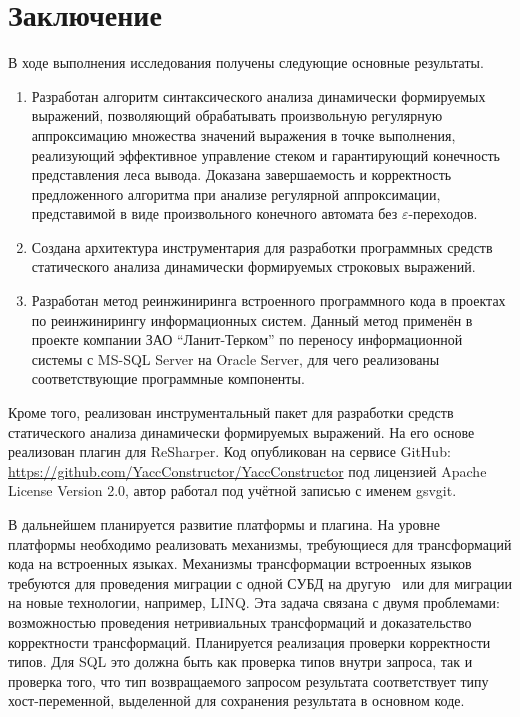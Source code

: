 \chapter*{Заключение}                       %

В ходе выполнения исследования получены следующие основные результаты.

\begin{enumerate}
    \item Разработан алгоритм синтаксического анализа динамически формируемых выражений, позволяющий обрабатывать произвольную регулярную аппроксимацию множества значений выражения в точке выполнения, реализующий 
    эффективное управление стеком и гарантирующий конечность представления леса вывода. Доказана завершаемость и корректность предложенного алгоритма при анализе регулярной аппроксимации, представимой в виде произвольного конечного автомата без $\varepsilon$-переходов.
    \item Создана архитектура инструментария для разработки программных средств статического анализа динамически формируемых строковых выражений.
    \item Разработан метод реинжиниринга встроенного программного кода в проектах по реинжинирингу информационных систем. Данный метод применён в проекте компании ЗАО ``Ланит-Терком'' по переносу информационной системы с MS-SQL Server на Oracle Server, для чего реализованы соответствующие программные компоненты.
\end{enumerate}

Кроме того, реализован инструментальный пакет для разработки средств статического анализа динамически формируемых выражений. На его основе реализован плагин для ReSharper. Код опубликован на сервисе GitHub: \\ \url{https://github.com/YaccConstructor/YaccConstructor} под лицензией Apache License Version 2.0, автор работал под учётной записью с именем gsvgit.

В дальнейшем планируется развитие платформы и плагина. На уровне платформы необходимо реализовать механизмы, требующиеся для трансформаций кода на встроенных языках. Механизмы трансформации встроенных языков требуются для проведения миграции с одной СУБД на другую~\cite{Syrcose} или для миграции на новые технологии, например, LINQ. Эта задача связана с двумя проблемами: возможностью проведения нетривиальных трансформаций и доказательство корректности трансформаций. Планируется реализация проверки корректности типов. Для SQL это должна быть как проверка типов внутри запроса, так и проверка того, что тип возвращаемого запросом результата соответствует типу хост-переменной, выделенной для сохранения результата в основном коде.


